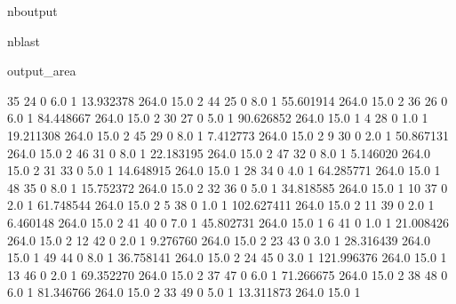\documentclass[letterpaper,10pt,english]{sphinxmanual}
\begin{document}
\begin{sphinxuseclass}{nboutput}
\begin{sphinxuseclass}{nblast}
{\begin{sphinxuseclass}{output_area}
\begin{sphinxuseclass}{}
\begin{sphinxVerbatim}[commandchars=\\\{\}]
35        24      0    6.0               1       13.932378  264.0  15.0   2
44        25      0    8.0               1       55.601914  264.0  15.0   2
36        26      0    6.0               1       84.448667  264.0  15.0   2
30        27      0    5.0               1       90.626852  264.0  15.0   1
4         28      0    1.0               1       19.211308  264.0  15.0   2
45        29      0    8.0               1        7.412773  264.0  15.0   2
9         30      0    2.0               1       50.867131  264.0  15.0   2
46        31      0    8.0               1       22.183195  264.0  15.0   2
47        32      0    8.0               1        5.146020  264.0  15.0   2
31        33      0    5.0               1       14.648915  264.0  15.0   1
28        34      0    4.0               1       64.285771  264.0  15.0   1
48        35      0    8.0               1       15.752372  264.0  15.0   2
32        36      0    5.0               1       34.818585  264.0  15.0   1
10        37      0    2.0               1       61.748544  264.0  15.0   2
5         38      0    1.0               1      102.627411  264.0  15.0   2
11        39      0    2.0               1        6.460148  264.0  15.0   2
41        40      0    7.0               1       45.802731  264.0  15.0   1
6         41      0    1.0               1       21.008426  264.0  15.0   2
12        42      0    2.0               1        9.276760  264.0  15.0   2
23        43      0    3.0               1       28.316439  264.0  15.0   1
49        44      0    8.0               1       36.758141  264.0  15.0   2
24        45      0    3.0               1      121.996376  264.0  15.0   1
13        46      0    2.0               1       69.352270  264.0  15.0   2
37        47      0    6.0               1       71.266675  264.0  15.0   2
38        48      0    6.0               1       81.346766  264.0  15.0   2
33        49      0    5.0               1       13.311873  264.0  15.0   1


\end{sphinxVerbatim}
\end{sphinxuseclass}
\end{sphinxuseclass}}
\end{sphinxuseclass}
\end{sphinxuseclass}
\end{document}
